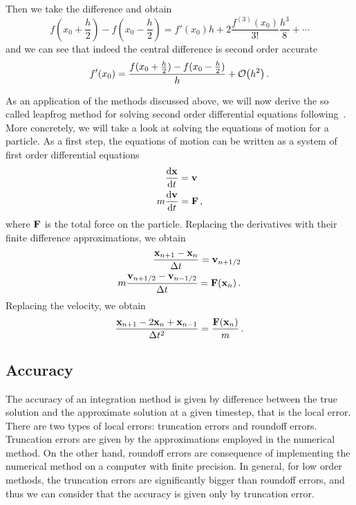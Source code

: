 \documentclass[12pt, class=report, crop=false]{standalone}
\begin{document}
Then we take the difference and obtain
\[
  f(x_0+\frac{h}{2}) - f(x_0-\frac{h}{2}) = f'(x_0)h
    + 2\frac{f^{(3)}(x_0)}{3!}\frac{h^3}{8} + \dotsb
\]
and we can see that indeed the central difference is second order accurate
\[
  f'(x_0) = \frac{f(x_0+\frac{h}{2}) - f(x_0-\frac{h}{2})}{h} + \order{h^2}\,.
\]

As an application of the methods discussed above, we will now derive the so called
leapfrog method for solving second order differential equations
following~\textcite[Chapter~4]{hockney_computersimulation_1988}. More concretely,
we will take a look at solving the equations of motion for a particle. As a first
step, the equations of motion can be written as a system of first order differential
equations
\begin{align*}
  \dv{\vb{x}}{t} &= \vb{v} \\
  m \dv{\vb{v}}{t} &= \vb{F}\,,
\end{align*}
where \(\vb{F}\) is the total force on the particle. Replacing the derivatives
with their finite difference approximations, we obtain
\begin{subequations}
  \begin{align}
    \label{eq:leapfrog}
    \frac{\vb{x}_{n+1} - \vb{x}_n}{\Delta t} = \vb{v}_{n+1/2} \\
    m \frac{\vb{v}_{n+1/2} - \vb{v}_{n-1/2}}{\Delta t} = \vb{F}(\vb{x}_n)\,.
  \end{align}
\end{subequations}
Replacing the velocity, we obtain
\begin{equation*}
  \frac{\vb{x}_{n+1}-2\vb{x}_n+\vb{x}_{n-1}}{\Delta t^2} = \frac{\vb{F}(\vb{x}_n)}{m}\,.
\end{equation*}

\subsection{Accuracy}

The accuracy of an integration method is given by difference between the true
solution and the approximate solution at a given timestep, that is the local
error. There are two types of local errors: truncation errors and roundoff errors.
Truncation errors are given by the approximations employed in the numerical method.
On the other hand, roundoff errors are consequence of implementing the numerical
method on a computer with finite precision. In general, for low order methods,
the truncation errors are significantly bigger than roundoff errors, and thus
we can consider that the accuracy is given only by truncation error.
\end{document}
